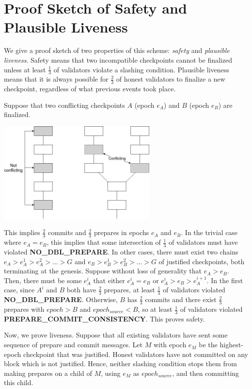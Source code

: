 \documentclass[12pt]{article}
\begin{document}
\section{Proof Sketch of Safety and Plausible Liveness}

We give a proof sketch of two properties of this scheme: \textit{safety} and \textit{plausible liveness}. Safety means that two incompatible checkpoints cannot be finalized unless at least $\frac{1}{3}$ of validators violate a slashing condition. Plausible liveness means that it is always possible for $\frac{2}{3}$ of honest validators to finalize a new checkpoint, regardless of what previous events took place.

Suppose that two conflicting checkpoints $A$ (epoch $e_A$) and $B$ (epoch $e_B$) are finalized.

\includegraphics[width=300px]{conflicting_checkpoints.png}

This implies $\frac{2}{3}$ commits and $\frac{2}{3}$ prepares in epochs $e_A$ and $e_B$. In the trivial case where $e_A = e_B$, this implies that some intersection of $\frac{1}{3}$ of validators must have violated \textbf{NO\_DBL\_PREPARE}. In other cases, there must exist two chains $e_A > e_A^1 > e_A^2 > ... > G$ and $e_B > e_B^1 > e_B^2 > ... > G$ of justified checkpoints, both terminating at the genesis. Suppose without loss of generality that $e_A > e_B$. Then, there must be some $e_A^i$ that either $e_A^i = e_B$ or $e_A^i > e_B > e_A^{i+1}$. In the first case, since $A^i$ and $B$ both have $\frac{2}{3}$ prepares, at least $\frac{1}{3}$ of validators violated \textbf{NO\_DBL\_PREPARE}. Otherwise, $B$ has $\frac{2}{3}$ commits and there exist $\frac{2}{3}$ prepares with $epoch > B$ and $epoch_{source} < B$, so at least $\frac{1}{3}$ of validators violated \textbf{PREPARE\_COMMIT\_CONSISTENCY}. This proves safety.

Now, we prove liveness. Suppose that all existing validators have sent some sequence of prepare and commit messages. Let $M$ with epoch $e_M$ be the highest-epoch checkpoint that was justified. Honest validators have not committed on any block which is not justified. Hence, neither slashing condition stops them from making prepares on a child of $M$, using $e_M$ as $epoch_{source}$, and then committing this child.
\end{document}
